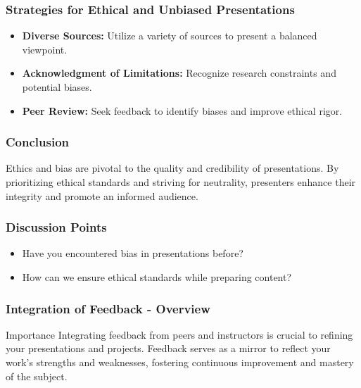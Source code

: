 \documentclass{beamer}
\begin{document}
\begin{frame}[fragile]
    \frametitle{Strategies for Ethical and Unbiased Presentations}
    \begin{itemize}
        \item \textbf{Diverse Sources:} Utilize a variety of sources to present a balanced viewpoint.
        \item \textbf{Acknowledgment of Limitations:} Recognize research constraints and potential biases.
        \item \textbf{Peer Review:} Seek feedback to identify biases and improve ethical rigor.
    \end{itemize}
\end{frame}

\begin{frame}[fragile]
    \frametitle{Conclusion}
    Ethics and bias are pivotal to the quality and credibility of presentations. By prioritizing ethical standards and striving for neutrality, presenters enhance their integrity and promote an informed audience.
\end{frame}

\begin{frame}[fragile]
    \frametitle{Discussion Points}
    \begin{itemize}
        \item Have you encountered bias in presentations before?
        \item How can we ensure ethical standards while preparing content?
    \end{itemize}
\end{frame}

\begin{frame}[fragile]
    \frametitle{Integration of Feedback - Overview}
    \begin{block}{Importance}
        Integrating feedback from peers and instructors is crucial to refining your presentations and projects. Feedback serves as a mirror to reflect your work's strengths and weaknesses, fostering continuous improvement and mastery of the subject.
    \end{block}
\end{frame}
\end{document}
